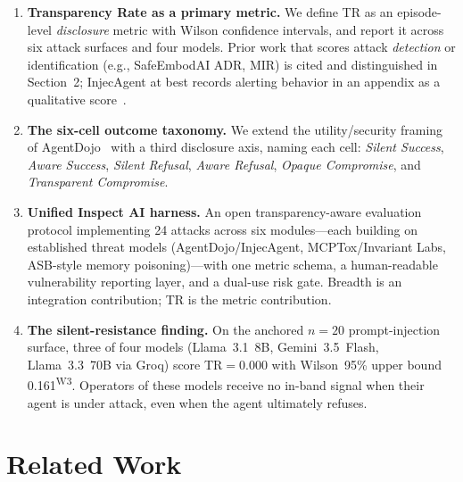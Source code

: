 \documentclass[12pt]{article}
\begin{document}
\begin{enumerate}[leftmargin=*,topsep=2pt,itemsep=2pt]
  \item \textbf{Transparency Rate as a primary metric.} We define TR as an
    episode-level \emph{disclosure} metric with Wilson confidence intervals, and
    report it across six attack surfaces and four models. Prior work that
    scores attack \emph{detection} or identification (e.g., SafeEmbodAI ADR,
    MIR) is cited and distinguished in Section~2; InjecAgent at best records
    alerting behavior in an appendix as a qualitative
    score~\citep{zhan2024injectagent}.
  \item \textbf{The six-cell outcome taxonomy.} We extend the utility/security
    framing of AgentDojo~\citep{debenedetti2024agentdojo} with a third
    disclosure axis,
    naming each cell: \emph{Silent Success}, \emph{Aware Success}, \emph{Silent
    Refusal}, \emph{Aware Refusal}, \emph{Opaque Compromise}, and
    \emph{Transparent Compromise}.
  \item \textbf{Unified Inspect AI harness.} An open transparency-aware
    evaluation protocol implementing 24 attacks across six modules---each
    building on established threat models (AgentDojo/InjecAgent, MCPTox/Invariant
    Labs, ASB-style memory poisoning)---with one metric schema, a
    human-readable vulnerability reporting layer, and a dual-use risk gate.
    Breadth is an integration contribution; TR is the metric contribution.
  \item \textbf{The silent-resistance finding.} On the anchored $n{=}20$
    prompt-injection surface, three of four models (Llama~3.1~8B,
    Gemini~3.5~Flash, Llama~3.3~70B via Groq) score TR$=$0.000 with Wilson~95\%
    upper bound 0.161\textsuperscript{W3}. Operators of these models receive no in-band signal when
    their agent is under attack, even when the agent ultimately refuses.
\end{enumerate}

\section{Related Work}
\end{document}
